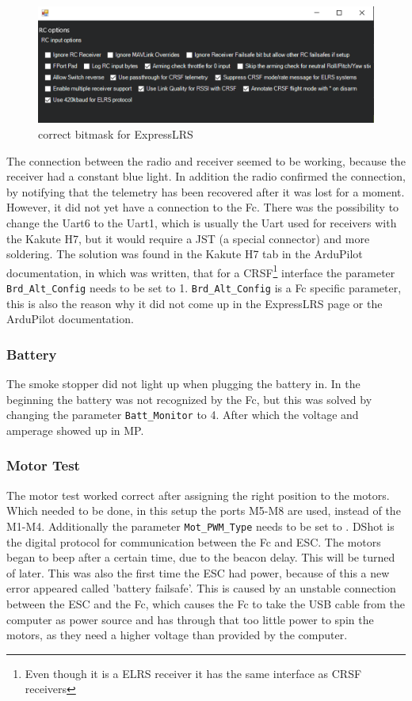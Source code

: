 \documentclass[svgnames]{article}
\begin{document}
\begin{figure}[ht]
	\centering
	\includegraphics[width=0.7\linewidth]{pictures/bitmask}
	\caption{correct bitmask for ExpressLRS}
	\label{fig:bitmask}
\end{figure}
	\newpage
	The connection between the radio and receiver seemed to be working, because the receiver had a constant blue light. In addition the radio confirmed the connection, by notifying that the telemetry has been recovered after it was lost for a moment. However, it did not yet have a connection to the Fc. There was the possibility to change the Uart6 to the Uart1, which is usually the Uart used for receivers with the Kakute H7, but it would require a JST (a special connector) and more soldering. The solution was found in the Kakute H7 tab in the ArduPilot documentation, in which was written, that for a CRSF\footnote{Even though it is a ELRS receiver it has the same interface as CRSF receivers} interface the parameter \lstinline|Brd_Alt_Config| needs to be set to 1. \lstinline|Brd_Alt_Config| is a Fc specific parameter, this is also the reason why it did not come up in the ExpressLRS page or the ArduPilot documentation. 

	\subsubsection{Battery}
	The smoke stopper did not light up when plugging the battery in. In the beginning the battery was not recognized by the \gls{Fc}, but this was solved by changing the parameter \lstinline|Batt_Monitor| to 4. After which the voltage and amperage showed up in \gls{MP}.

	\subsubsection{Motor Test}
	The motor test worked correct after assigning the right position to the motors. Which needed to be done, in this setup the ports M5-M8 are used, instead of the M1-M4. Additionally the parameter \lstinline|Mot_PWM_Type| needs to be set to . \Gls{DShot} is the digital protocol for communication between the \gls{Fc} and \gls{ESC}. The motors began to beep after a certain time, due to the beacon delay. This will be turned of later. This was also the first time the \gls{ESC} had power, because of this a new error appeared called 'battery failsafe'. This is caused by an unstable connection between the \gls{ESC} and the \gls{Fc}, which causes the \gls{Fc} to take the USB cable from the computer as power source and has through that too little power to spin the motors, as they need a higher voltage than provided by the computer.
	
\end{document}

